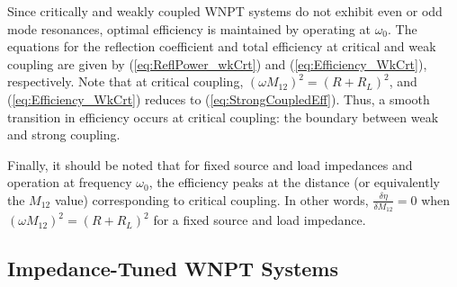 \documentclass[journal]{IEEEtran}
\begin{document}
Since critically and weakly coupled WNPT systems do not exhibit even or odd mode resonances, optimal efficiency is maintained by operating at $\omega_0$. The equations for the reflection coefficient  and total efficiency at critical and weak coupling are given by (\ref{eq:ReflPower_wkCrt}) and (\ref{eq:Efficiency_WkCrt}), respectively. Note that at critical coupling, $\left(\omega M_{12}\right)^2 = \left(R+R_L\right)^2$, and (\ref{eq:Efficiency_WkCrt}) reduces to (\ref{eq:StrongCoupledEff}). Thus, a smooth transition in efficiency occurs at critical coupling: the boundary between weak and strong coupling.

Finally, it should be noted that for fixed source and load impedances and operation at frequency $\omega_0$, the efficiency peaks at the distance (or equivalently the $M_{12}$ value) corresponding to critical coupling. In other words, $\frac{\delta \eta}{\delta M_{12}}=0$ when $\left(\omega M_{12}\right)^2=(R+R_L)^2 $ for  a fixed source and load impedance.

\subsection{Impedance-Tuned WNPT Systems}
\label{sec:CCImpMatch}
\end{document}
